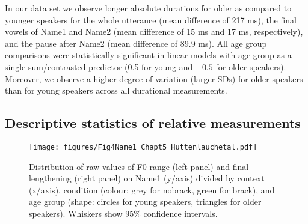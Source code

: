 \documentclass[output=paper]{langscibook}
\begin{document}
\begin{table}
\caption{Descriptive statistics of absolute durational measurements by age group and statistical group comparison.} 
\label{tab.descr_acoustic} 
\end{table}

In our data set we observe longer absolute durations for older as compared to younger speakers for the whole utterance (mean difference of 217 ms), the final vowels of Name1 and Name2 (mean difference of 15 ms and 17 ms, respectively), and the pause after Name2 (mean difference of 89.9 ms). All age group comparisons were statistically significant in linear models with age group as a single sum\-/contrasted predictor (0.5 for young and $-0.5$ for older speakers). Moreover, we observe a higher degree of variation (larger SDs) for older speakers than for young speakers across all durational measurements. 

\subsection{Descriptive statistics of relative measurements}

\begin{figure}[p]
\texttt{[image: figures/Fig4Name1\_Chapt5\_Huttenlauchetal.pdf]}
\caption{Distribution of raw values of F0 range (left panel) and final lengthening (right panel) on Name1 (y\-/axis) divided by context (x\-/axis), condition (colour: grey for nobrack, green for brack), and age group (shape: circles for young speakers, triangles for older speakers). Whiskers show 95\% confidence intervals.}
\label{fig:name1}
\end{figure}
\end{document}
